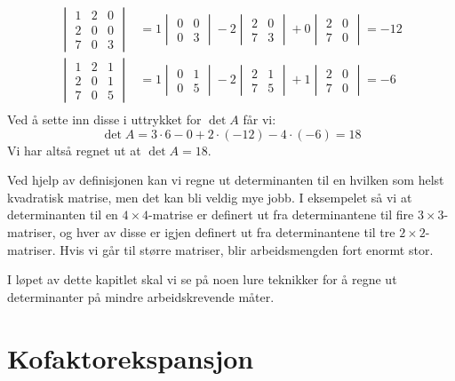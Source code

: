 \begin{ex}
\begin{align*}
\begin{vmatrix}
1 & 2 & 0 \\
2 & 0 & 0 \\
7 & 0 & 3
\end{vmatrix}
&=
  1 \begin{vmatrix} 0 & 0 \\ 0 & 3 \end{vmatrix}
- 2 \begin{vmatrix} 2 & 0 \\ 7 & 3 \end{vmatrix}
+ 0 \begin{vmatrix} 2 & 0 \\ 7 & 0 \end{vmatrix}
 = -12 \\
\begin{vmatrix}
1 & 2 & 1 \\
2 & 0 & 1 \\
7 & 0 & 5
\end{vmatrix}
&=
  1 \begin{vmatrix} 0 & 1 \\ 0 & 5 \end{vmatrix}
- 2 \begin{vmatrix} 2 & 1 \\ 7 & 5 \end{vmatrix}
+ 1 \begin{vmatrix} 2 & 0 \\ 7 & 0 \end{vmatrix}
 = -6 \\
\end{align*}
Ved å sette inn disse i uttrykket for $\det A$ får vi:
\[
\det A = 3 \cdot 6 - 0 + 2 \cdot (-12) - 4 \cdot (-6) = 18
\]
Vi har altså regnet ut at $\det A = 18$.
\end{ex}

Ved hjelp av definisjonen kan vi regne ut determinanten til en hvilken
som helst kvadratisk matrise, men det kan bli veldig mye jobb.  I
eksempelet så vi at determinanten til en $4 \times 4$-matrise er
definert ut fra determinantene til fire $3 \times 3$-matriser, og hver
av disse er igjen definert ut fra determinantene til tre
$2 \times 2$-matriser.  Hvis vi går til større matriser, blir
arbeidsmengden fort enormt stor.

I løpet av dette kapitlet skal vi se på noen lure teknikker for å
regne ut determinanter på mindre arbeidskrevende måter.


\section*{Kofaktorekspansjon}

